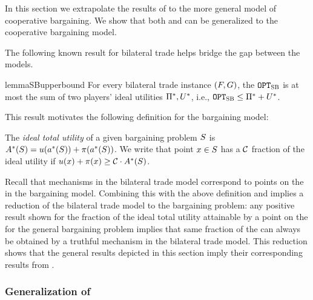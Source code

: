 
In this section we extrapolate the results of  to the more general model of cooperative bargaining.
We show that both  and  can be generalized to the cooperative bargaining model. 

The following known result for bilateral trade helps bridge the gap between the models.

\begin{restatable}{lemma}{SBupperbound}
 \label{lemma:SB-upper-bound}
     For every bilateral trade instance $(F,G)$, the {\SecondBest} $\texttt{OPT}_{\textsc{SB}}$ is at most the sum of two players' ideal utilities $\Pi^*,U^*$, i.e., $\texttt{OPT}_{\textsc{SB}} \leq \Pi^* + U^*$.
\end{restatable}

This result motivates the following definition for the bargaining model:

\begin{definition}
    The \emph{ideal {total} utility} of a given bargaining problem $S$ is $A^*(S) = u(a^*(S)) + \pi(a^*(S))$. We write that point $x\in S$ has a $\mathcal{C}$ fraction of the ideal utility if $u(x) + \pi(x) \geq \mathcal{C}\cdot A^*(S)$.
\end{definition}

Recall that {\ksfair} mechanisms in the bilateral trade model correspond to points on the {\ksline} in the bargaining model. Combining this with the above definition and  implies a reduction of the bilateral trade model to the bargaining problem: {any positive result shown for the fraction of the ideal {total} utility attainable by a point on the {\ksline} for the general bargaining problem implies that same fraction of the {\SecondBest} can always be obtained by a truthful {\ksfair} mechanism in the bilateral trade model}. This reduction shows that the general results depicted in this section imply their corresponding results from .

\subsubsection{Generalization of \texorpdfstring{}{Theorem~\ref{thm:blackbox reduction}}}

